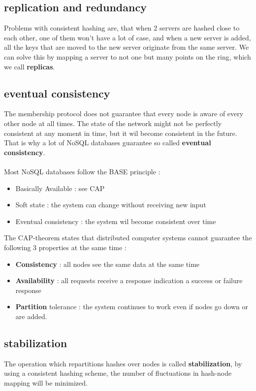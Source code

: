\documentclass{report}
\begin{document}
			\subsection{replication and redundancy}
				Problems with consistent hashing are, that when 2 servers are hashed close to each other, one of them won't have a lot of case, and when a new server is added, all the keys that are moved to the new server originate from the same server. We can solve this by mapping a server to not one but many points on the ring, which we call \textbf{replicas}.
			\subsection{eventual consistency}
				The membership protocol does not guarantee that every node is aware of every other node at all times. The state of the network might not be perfectly consistent at any moment in time, but it wil become consistent in the future. That is why a lot of NoSQL databases guarantee so called \textbf{eventual consistency}.
				\\
				\\
				Most NoSQL databases follow the BASE principle : 
				\begin{itemize}
					\item Basically Available : see CAP
					\item Soft state : the system can change without receiving new input
					\item Eventual consistency : the system wil become consistent over time
				\end{itemize}
				The CAP-theorem states that distributed computer systems cannot guarantee the following 3 properties at the same time : 
				\begin{itemize}
					\item \textbf{Consistency} : all nodes see the same data at the same time
					\item \textbf{Availability} : all requests receive a response indication a success or failure response 
					\item \textbf{Partition} tolerance : the system continues to work even if nodes go down or are added.
				\end{itemize}
			\subsection{stabilization}
				The operation which repartitions hashes over nodes is called \textbf{stabilization}, by using a consistent hashing scheme, the number of fluctuations in hash-node mapping will be minimized.
\end{document}
